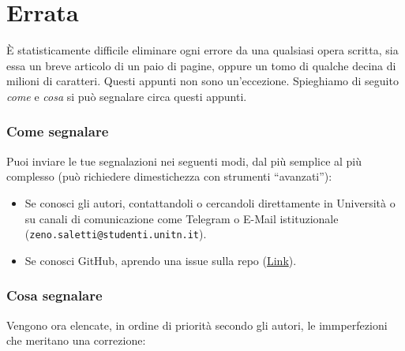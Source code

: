 \section*{Errata}
È statisticamente difficile eliminare ogni errore da una qualsiasi opera scritta, sia
essa un breve articolo di un paio di pagine, oppure un tomo di qualche decina di milioni
di caratteri. Questi appunti non sono un'eccezione.
Spieghiamo di seguito \textit{come} e \textit{cosa} si può segnalare circa questi appunti.

\subsubsection*{Come segnalare}
Puoi inviare le tue segnalazioni nei seguenti modi, dal più semplice al più complesso
(può richiedere dimestichezza con strumenti ``avanzati''):
\begin{itemize}
    \item Se conosci gli autori, contattandoli o cercandoli direttamente in Università
    o su canali di comunicazione come Telegram o E-Mail istituzionale
    (\texttt{zeno.saletti@studenti.unitn.it}).

    \item Se conosci GitHub, aprendo una issue sulla repo (\href{https://github.com/zenosalty/courses-phy}{\faGithub \space Link}).

\end{itemize}

\subsubsection*{Cosa segnalare}
Vengono ora elencate, in ordine di priorità secondo gli autori, le immperfezioni che meritano una correzione:

